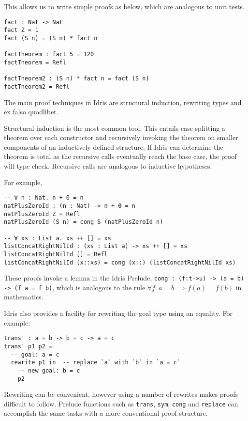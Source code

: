 \documentclass[]{report}
\begin{document}
This allows us to write simple proofs as below, which are analogous to unit tests.

\begin{verbatim}
fact : Nat -> Nat
fact Z = 1
fact (S n) = (S n) * fact n

factTheorem : fact 5 = 120
factTheorem = Refl

factTheorem2 : (S n) * fact n = fact (S n)
factTheorem2 = Refl
\end{verbatim}

The main proof techniques in Idris are structural induction, rewriting types and ex falso quodlibet.

Structural induction is the most common tool. This entails case splitting a theorem over each constructor and recursively invoking the theorem on smaller components of an inductively defined structure. If Idris can determine the theorem is total as the recursive calls eventually reach the base case, the proof will type check. Recursive calls are analogous to inductive hypotheses.

For example,

\begin{verbatim}
-- ∀ n : Nat. n + 0 = n
natPlusZeroId : (n : Nat) -> n + 0 = n
natPlusZeroId Z = Refl
natPlusZeroId (S n) = cong S (natPlusZeroId n)

-- ∀ xs : List a. xs ++ [] = xs
listConcatRightNilId : (xs : List a) -> xs ++ [] = xs
listConcatRightNilId [] = Refl
listConcatRightNilId (x::xs) = cong (x::) (listConcatRightNilId xs)
\end{verbatim}

These proofs invoke a lemma in the Idris Prelude, \texttt{cong :\ (f:t->u) -> (a = b) -> (f a = f b)}, which is analogous to the rule $\forall f.~a=b\!\!\implies\!\! f(a)=f(b)$ in mathematics.

Idris also provides a facility for rewriting the goal type using an equality. For example:

\begin{verbatim}
trans' : a = b -> b = c -> a = c
trans' p1 p2 =
  -- goal: a = c
  rewrite p1 in  -- replace `a` with `b` in `a = c`
    -- new goal: b = c
    p2
\end{verbatim}

Rewriting can be convenient, however using a number of rewrites makes proofs difficult to follow. Prelude functions such as \texttt{trans}, \texttt{sym}, \texttt{cong} and \texttt{replace} can accomplish the same tasks with a more conventional proof structure.
\end{document}
